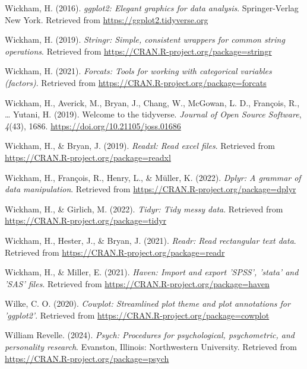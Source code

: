 \documentclass[
  man]{apa6}
\newlength{\cslhangindent}
\newenvironment{CSLReferences}[2] %
 {\begin{list}{}{%
  \setlength{\itemindent}{0pt}
  \setlength{\leftmargin}{0pt}
  \setlength{\parsep}{0pt}
  \ifodd #1
   \setlength{\leftmargin}{\cslhangindent}
   \setlength{\itemindent}{-1\cslhangindent}
  \fi
  \setlength{\itemsep}{#2\baselineskip}}}
 {\end{list}}
\begin{document}
\begin{CSLReferences}{1}{0}
Wickham, H. (2016). \emph{ggplot2: Elegant graphics for data analysis}. Springer-Verlag New York. Retrieved from \url{https://ggplot2.tidyverse.org}

Wickham, H. (2019). \emph{Stringr: Simple, consistent wrappers for common string operations}. Retrieved from \url{https://CRAN.R-project.org/package=stringr}

Wickham, H. (2021). \emph{Forcats: Tools for working with categorical variables (factors)}. Retrieved from \url{https://CRAN.R-project.org/package=forcats}

Wickham, H., Averick, M., Bryan, J., Chang, W., McGowan, L. D., François, R., \ldots{} Yutani, H. (2019). Welcome to the {tidyverse}. \emph{Journal of Open Source Software}, \emph{4}(43), 1686. \url{https://doi.org/10.21105/joss.01686}

Wickham, H., \& Bryan, J. (2019). \emph{Readxl: Read excel files}. Retrieved from \url{https://CRAN.R-project.org/package=readxl}

Wickham, H., François, R., Henry, L., \& Müller, K. (2022). \emph{Dplyr: A grammar of data manipulation}. Retrieved from \url{https://CRAN.R-project.org/package=dplyr}

Wickham, H., \& Girlich, M. (2022). \emph{Tidyr: Tidy messy data}. Retrieved from \url{https://CRAN.R-project.org/package=tidyr}

Wickham, H., Hester, J., \& Bryan, J. (2021). \emph{Readr: Read rectangular text data}. Retrieved from \url{https://CRAN.R-project.org/package=readr}

Wickham, H., \& Miller, E. (2021). \emph{Haven: Import and export 'SPSS', 'stata' and 'SAS' files}. Retrieved from \url{https://CRAN.R-project.org/package=haven}

Wilke, C. O. (2020). \emph{Cowplot: Streamlined plot theme and plot annotations for 'ggplot2'}. Retrieved from \url{https://CRAN.R-project.org/package=cowplot}

William Revelle. (2024). \emph{Psych: Procedures for psychological, psychometric, and personality research}. Evanston, Illinois: Northwestern University. Retrieved from \url{https://CRAN.R-project.org/package=psych}


\end{CSLReferences}
\end{document}
